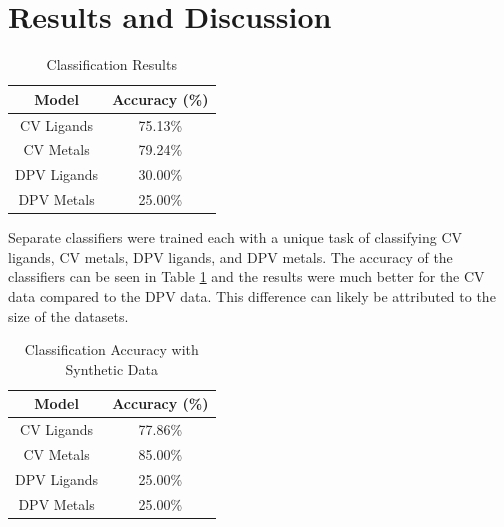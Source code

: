 \section{Results and Discussion}
\begin{table}[!h]
\begin{center}
\begin{tabular}{c|c}
Model & Accuracy (\%) \\
\hline
CV Ligands & 75.13\% \\
CV Metals & 79.24\% \\
DPV Ligands & 30.00\% \\
DPV Metals & 25.00\%
\end{tabular}
\caption{Classification Results}
\label{classification_results}
\end{center}
\end{table}
Separate classifiers were trained each with a unique task of classifying CV ligands, CV metals, DPV ligands, and DPV metals. 
The accuracy of the classifiers can be seen in Table \ref{classification_results} and the results were much better for the CV data compared to the DPV data. This difference can likely be attributed to the size of the datasets. 
\begin{table}[!h]
\begin{center}
\begin{tabular}{c|c}
Model & Accuracy (\%) \\
\hline
CV Ligands & 77.86\% \\
CV Metals & 85.00\% \\
DPV Ligands & 25.00\% \\
DPV Metals & 25.00\%
\end{tabular}
\caption{Classification Accuracy with Synthetic Data}
\label{vae_classification_results}
\end{center}
\end{table}
